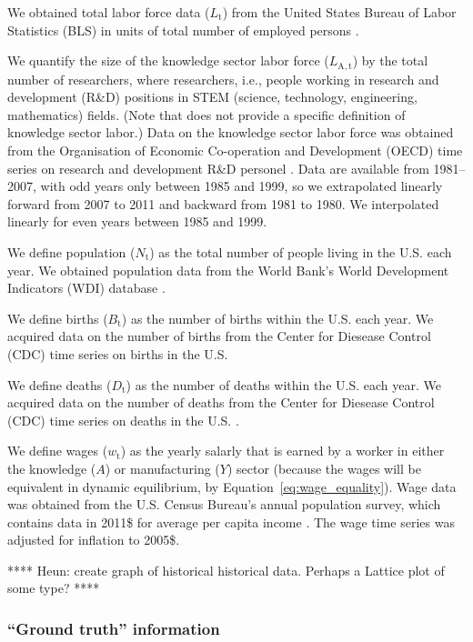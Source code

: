 \documentclass[letterpaper,12pt]{article}
\begin{document}
We obtained total labor force data ($L_\mathrm{t}$) from the United States Bureau of Labor Statistics (BLS) in units of total number of employed persons \citep{BLS:2013a}. 

We quantify the size of the knowledge sector labor force ($L_\mathrm{A,t}$) by the total number of researchers, where researchers, i.e., people working in research and development (R\&D) positions in STEM (science, technology, engineering, mathematics) fields. (Note that \citet{Jones:2001wn} does not provide a specific definition of knowledge sector labor.) Data on the knowledge sector labor force was obtained from the Organisation of Economic Co-operation and Development (OECD) time series on research and development R\&D personel \citep{OECDStatExtracts:2013a}. Data are available from 1981--2007, with odd years only between 1985 and 1999, so we extrapolated linearly forward from 2007 to 2011 and backward from 1981 to 1980. We interpolated linearly for even years between 1985 and 1999.

We define population ($N_\mathrm{t}$) as the total number of people living in the U.S. each year. We obtained population data from the World Bank's World Development Indicators (WDI) database \citep{WorldBankWDI:2013a}.

We define births ($B_\mathrm{t}$) as the number of births within the U.S. each year. We acquired data on the number of births from the Center for Diesease Control (CDC) time series on births in the U.S. \citep{Martin:2012tc, Hamilton:2012ww}

We define deaths ($D_\mathrm{t}$) as the number of deaths within the U.S. each year. We acquired data on the number of deaths from the Center for Diesease Control (CDC) time series on deaths in the U.S. \citep{Murphy:2013vg, Hoyert:2012tv}.

We define wages ($w_\mathrm{t}$) as the yearly salarly that is earned by a worker in either the knowledge ($A$) or manufacturing ($Y$) sector (because the wages will be equivalent in dynamic equilibrium, by Equation~\ref{eq:wage_equality}). Wage data was obtained from the U.S. Census Bureau's annual population survey, which contains data in 2011\$ for average per capita income \citep[Table~P-1, \texttt{All Races}]{USCB:2013a}. The wage time series was adjusted for inflation to 2005\$.

**** Heun: create graph of historical historical data. Perhaps a Lattice plot of some type? ****

\subsubsection{``Ground truth'' information}
\label{sec:basic_model_ground_truth}
\end{document}
